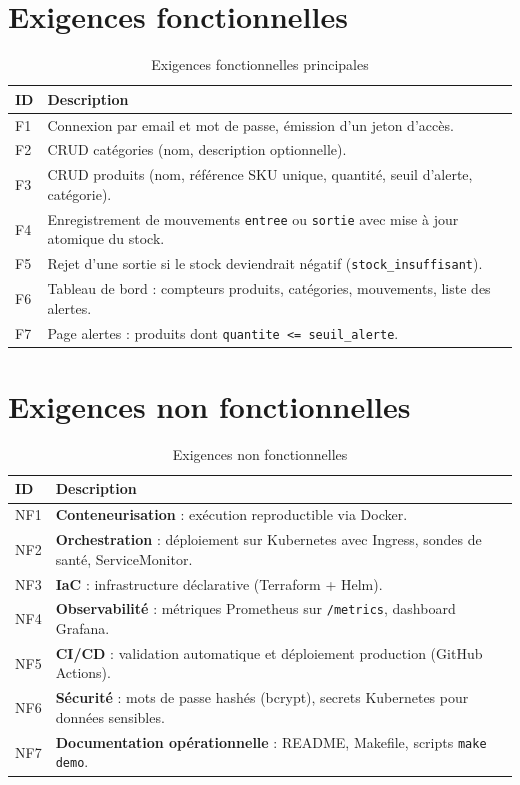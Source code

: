 \section{Exigences fonctionnelles}

\begin{table}[htbp]
  \centering
  \caption{Exigences fonctionnelles principales}
  \label{tab:exigences-fonctionnelles}
  \small
  \begin{tabular}{@{}p{2.2cm}p{11cm}@{}}
    \toprule
    \textbf{ID} & \textbf{Description} \\
    \midrule
    F1 & Connexion par email et mot de passe, émission d'un jeton d'accès. \\
    F2 & CRUD catégories (nom, description optionnelle). \\
    F3 & CRUD produits (nom, référence SKU unique, quantité, seuil d'alerte, catégorie). \\
    F4 & Enregistrement de mouvements \texttt{entree} ou \texttt{sortie} avec mise à jour atomique du stock. \\
    F5 & Rejet d'une sortie si le stock deviendrait négatif (\texttt{stock\_insuffisant}). \\
    F6 & Tableau de bord : compteurs produits, catégories, mouvements, liste des alertes. \\
    F7 & Page alertes : produits dont \texttt{quantite <= seuil\_alerte}. \\
    \bottomrule
  \end{tabular}
\end{table}

\section{Exigences non fonctionnelles}

\begin{table}[htbp]
  \centering
  \caption{Exigences non fonctionnelles}
  \label{tab:exigences-nf}
  \small
  \begin{tabular}{@{}p{2.2cm}p{11cm}@{}}
    \toprule
    \textbf{ID} & \textbf{Description} \\
    \midrule
    NF1 & \textbf{Conteneurisation} : exécution reproductible via Docker. \\
    NF2 & \textbf{Orchestration} : déploiement sur Kubernetes avec Ingress, sondes de santé, ServiceMonitor. \\
    NF3 & \textbf{IaC} : infrastructure déclarative (Terraform + Helm). \\
    NF4 & \textbf{Observabilité} : métriques Prometheus sur \texttt{/metrics}, dashboard Grafana. \\
    NF5 & \textbf{CI/CD} : validation automatique et déploiement production (GitHub Actions). \\
    NF6 & \textbf{Sécurité} : mots de passe hashés (bcrypt), secrets Kubernetes pour données sensibles. \\
    NF7 & \textbf{Documentation opérationnelle} : README, Makefile, scripts \texttt{make demo}. \\
    \bottomrule
  \end{tabular}
\end{table}

